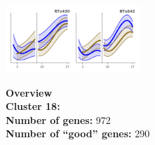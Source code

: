 \begin{multicols}{2}
\includegraphics[width=2in]{figures/clusters/leaf_Preflowering_17.png}
\columnbreak

\noindent \textbf{Overview}\\\textbf{Cluster 18:}  \\
\textbf{Number of genes:} 972 \\
\textbf{Number of ``good'' genes:} 290 \\
\end{multicols}

